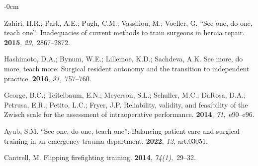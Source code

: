 \documentclass[fire,casereport,accept,moreauthors,pdftex]{Definitions/mdpi}  %
\begin{document}
\begin{adjustwidth}{-\extralength}{0cm}
\begin{thebibliography}{999}
Zahiri, H.R.; Park, A.E.; Pugh, C.M.; Vassiliou, M.; Voeller, G.
\newblock ``See one, do one, teach one'': Inadequacies of current methods to
  train surgeons in hernia repair.
 {\bf 2015}, {\em 29},~2867--2872.

Hashimoto, D.A.; Bynum, W.E.; Lillemoe, K.D.; Sachdeva, A.K.
\newblock See more, do more, teach more: Surgical resident autonomy and the
  transition to independent practice.
 {\bf 2016}, {\em 91},~757--760.

George, B.C.; Teitelbaum, E.N.; Meyerson, S.L.; Schuller, M.C.; DaRosa, D.A.;
  Petrusa, E.R.; Petito, L.C.; Fryer, J.P.
\newblock Reliability, validity, and feasibility of the Zwisch scale for the
  assessment of intraoperative performance.
 {\bf 2014}, {\em 71},~e90--e96.

Ayub, S.M.
\newblock ``See one, do one, teach one'': Balancing patient care and surgical
  training in an emergency trauma department.
 {\bf 2022}, {\em 12}, art.03051.

Cantrell, M.
\newblock Flipping firefighting training.
 {\textbf{2014}}, {\em 74(1)},~29--32. %

\end{thebibliography}


%

\end{adjustwidth}
\end{document}
